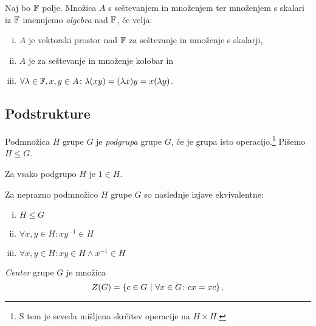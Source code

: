\begin{definicija}
Naj bo $\mathbb{F}$ polje. Množica $A$ s seštevanjem in množenjem ter
množenjem s skalari iz $\mathbb{F}$ imenujemo
\emph{algebra} nad $\mathbb{F}$, če
velja:

\begin{enumerate}[i)]
\item $A$ je vektorski prostor nad $\mathbb{F}$ za seštevanje in množenje s
skalarji,
\item $A$ je za seštevanje in množenje kolobar in
\item $\forall \lambda \in \mathbb{F}, x,y \in A \colon
\lambda(xy) = (\lambda x)y = x(\lambda y)$.
\end{enumerate}
\end{definicija}

\newpage

\subsection{Podstrukture}


\begin{definicija}
Podmnožica $H$ grupe $G$ je
\emph{podgrupa} grupe $G$,
če je grupa isto operacijo.\footnote{S tem je seveda mišljena
skrčitev operacije na $H \times H$.} Pišemo $H \leq G$.
\end{definicija}

\begin{opomba}
Za vsako podgrupo $H$ je $1 \in H$.
\end{opomba}

\begin{trditev}
Za neprazno podmnožico $H$ grupe $G$ so naslednje izjave
ekvivalentne:

\begin{enumerate}[i)]
\item $H \leq G$
\item $\forall x, y \in H \colon xy^{-1} \in H$
\item $\forall x, y \in H \colon xy \in H \land x^{-1} \in H$
\end{enumerate}
\end{trditev}

\obvs

\begin{definicija}
\emph{Center} grupe $G$ je
množica
\[
Z(G) = \left\{c \in G~\middle\vert~\forall x \in G \colon cx = xc\right\}.
\]
\end{definicija}

